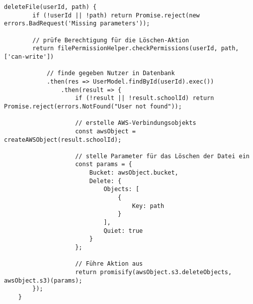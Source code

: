 \begin{lstlisting}[caption=deleteFile() Funktion der AWS S3-Strategy, label=code:awsS3deletefile]
	deleteFile(userId, path) {
		if (!userId || !path) return Promise.reject(new errors.BadRequest('Missing parameters'));
	
		// prüfe Berechtigung für die Löschen-Aktion
		return filePermissionHelper.checkPermissions(userId, path, ['can-write'])
	
			// finde gegeben Nutzer in Datenbank
			.then(res => UserModel.findById(userId).exec())
				.then(result => {
					if (!result || !result.schoolId) return Promise.reject(errors.NotFound("User not found"));
		
					// erstelle AWS-Verbindungsobjekts
					const awsObject = createAWSObject(result.schoolId);
		
					// stelle Parameter für das Löschen der Datei ein
					const params = {
						Bucket: awsObject.bucket,
						Delete: {
							Objects: [
								{
									Key: path
								}
							],
							Quiet: true
						}
					};
		
					// Führe Aktion aus
					return promisify(awsObject.s3.deleteObjects, awsObject.s3)(params);
		});
	}
\end{lstlisting}


\clearpage